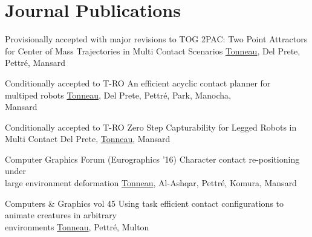 \documentclass{tccv}
\begin{document}
\section{Journal Publications}

\begin{eventlist}

\item {Provisionally accepted with major revisions to TOG} 
{2PAC: Two Point Attractors for Center of Mass
Trajectories in Multi Contact Scenarios}
{\underline{Tonneau}, Del Prete, Pettr\'e, Mansard}

\item {Conditionally accepted to T-RO} 
{An efficient acyclic contact planner for \\multiped robots}
{\underline{Tonneau}, Del Prete, Pettr\'e, Park, Manocha,\\ Mansard}

\item {Conditionally accepted to T-RO} 
{Zero Step Capturability for Legged Robots in Multi Contact}
{Del Prete, \underline{Tonneau}, Mansard}

\item {Computer Graphics Forum (Eurographics '16)} 
{Character contact re-positioning under \\large environment deformation}
{\underline{Tonneau}, Al-Ashqar, Pettr\'e, Komura, Mansard}

\item {Computers \& Graphics vol 45} 
{Using task efficient contact configurations to animate 
creatures in arbitrary\\ environments}
{\underline{Tonneau}, Pettr\'e, Multon}



\end{eventlist}
\end{document}
